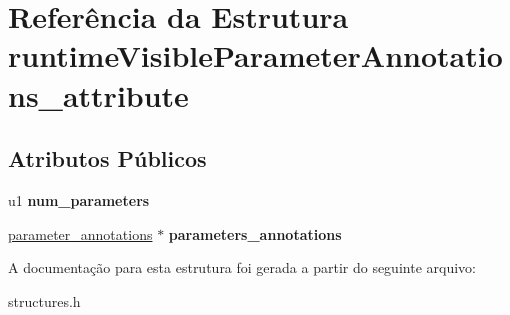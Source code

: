 \hypertarget{structruntimeVisibleParameterAnnotations__attribute}{}\section{Referência da Estrutura runtime\+Visible\+Parameter\+Annotations\+\_\+attribute}
\label{structruntimeVisibleParameterAnnotations__attribute}
\subsection*{Atributos Públicos}
\begin{DoxyCompactItemize}
\item 
\mbox{\label{structruntimeVisibleParameterAnnotations__attribute_ae31e0bdeb2761d98c425ff91c84a5eea}} 
u1 {\bfseries num\+\_\+parameters}
\item 
\mbox{\label{structruntimeVisibleParameterAnnotations__attribute_a42e5e477f793842b0caeba7b32088740}} 
\hyperlink{structparameter__annotations}{parameter\+\_\+annotations} $\ast$ {\bfseries parameters\+\_\+annotations}
\end{DoxyCompactItemize}


A documentação para esta estrutura foi gerada a partir do seguinte arquivo\+:\begin{DoxyCompactItemize}
\item 
structures.\+h\end{DoxyCompactItemize}
